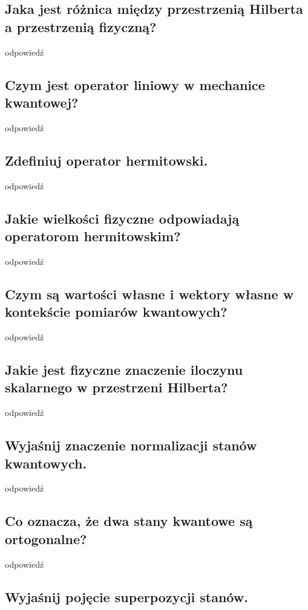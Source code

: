 \subsection{Jaka jest różnica między przestrzenią Hilberta a przestrzenią fizyczną?}

odpowiedź

\subsection{Czym jest operator liniowy w mechanice kwantowej?}

odpowiedź

\subsection{Zdefiniuj operator hermitowski.}

odpowiedź

\subsection{Jakie wielkości fizyczne odpowiadają operatorom hermitowskim?}

odpowiedź

\subsection{Czym są wartości własne i wektory własne w kontekście pomiarów kwantowych?}

odpowiedź

\subsection{Jakie jest fizyczne znaczenie iloczynu skalarnego w przestrzeni Hilberta?}

odpowiedź

\subsection{Wyjaśnij znaczenie normalizacji stanów kwantowych.}

odpowiedź

\subsection{Co oznacza, że dwa stany kwantowe są ortogonalne?}

odpowiedź

\subsection{Wyjaśnij pojęcie superpozycji stanów.}

